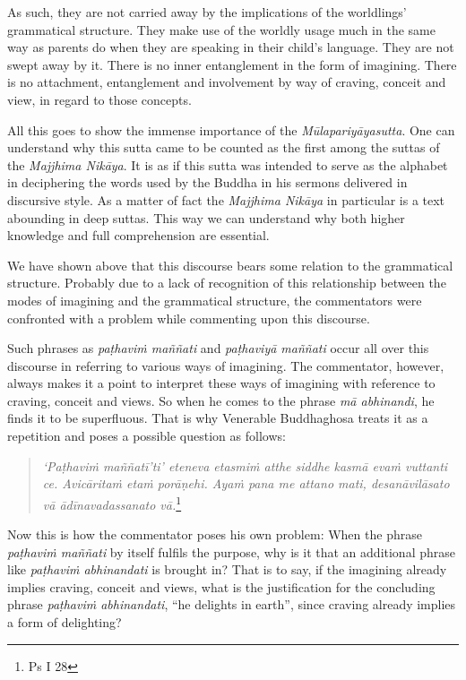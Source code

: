 As such, they are not carried away by the implications of the worldlings' grammatical structure. They make use of the worldly usage much in the same way as parents do when they are speaking in their child's language. They are not swept away by it. There is no inner entanglement in the form of imagining. There is no attachment, entanglement and involvement by way of craving, conceit and view, in regard to those concepts.

All this goes to show the immense importance of the \emph{Mūlapariyāyasutta}. One can understand why this sutta came to be counted as the first among the suttas of the \emph{Majjhima Nikāya}. It is as if this sutta was intended to serve as the alphabet in deciphering the words used by the Buddha in his sermons delivered in discursive style. As a matter of fact the \emph{Majjhima Nikāya} in particular is a text abounding in deep suttas. This way we can understand why both higher knowledge and full comprehension are essential.

We have shown above that this discourse bears some relation to the grammatical structure. Probably due to a lack of recognition of this relationship between the modes of imagining and the grammatical structure, the commentators were confronted with a problem while commenting upon this discourse.

Such phrases as \emph{paṭhaviṁ maññati} and \emph{paṭhaviyā maññati} occur all over this discourse in referring to various ways of imagining. The commentator, however, always makes it a point to interpret these ways of imagining with reference to craving, conceit and views. So when he comes to the phrase \emph{mā abhinandi}, he finds it to be superfluous. That is why Venerable Buddhaghosa treats it as a repetition and poses a possible question as follows:

\begin{quote}
\emph{`Paṭhaviṁ maññatī'ti' eteneva etasmiṁ atthe siddhe kasmā evaṁ vuttanti ce. Avicāritaṁ etaṁ porāṇehi. Ayaṁ pana me attano mati, desanāvilāsato vā ādīnavadassanato vā.}\footnote{Ps I 28}
\end{quote}

Now this is how the commentator poses his own problem: When the phrase \emph{paṭhaviṁ maññati} by itself fulfils the purpose, why is it that an additional phrase like \emph{paṭhaviṁ abhinandati} is brought in? That is to say, if the imagining already implies craving, conceit and views, what is the justification for the concluding phrase \emph{paṭhaviṁ abhinandati}, ``he delights in earth'', since craving already implies a form of delighting?


